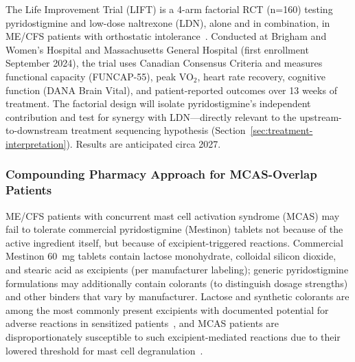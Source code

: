 The Life Improvement Trial (LIFT) is a 4-arm factorial RCT (n=160) testing pyridostigmine and low-dose naltrexone (LDN), alone and in combination, in ME/CFS patients with orthostatic intolerance~\cite{LIFT2025protocol}. Conducted at Brigham and Women's Hospital and Massachusetts General Hospital (first enrollment September 2024), the trial uses Canadian Consensus Criteria and measures functional capacity (FUNCAP-55), peak VO$_2$, heart rate recovery, cognitive function (DANA Brain Vital), and patient-reported outcomes over 13 weeks of treatment. The factorial design will isolate pyridostigmine's independent contribution and test for synergy with LDN---directly relevant to the upstream-to-downstream treatment sequencing hypothesis (Section~\ref{sec:treatment-interpretation}). Results are anticipated circa 2027.

\subsubsection{Compounding Pharmacy Approach for MCAS-Overlap Patients}
\label{sec:pyridostigmine-compounding}

ME/CFS patients with concurrent mast cell activation syndrome (MCAS) may fail to tolerate commercial pyridostigmine (Mestinon) tablets not because of the active ingredient itself, but because of excipient-triggered reactions. Commercial Mestinon 60~mg tablets contain lactose monohydrate, colloidal silicon dioxide, and stearic acid as excipients (per manufacturer labeling); generic pyridostigmine formulations may additionally contain colorants (to distinguish dosage strengths) and other binders that vary by manufacturer. Lactose and synthetic colorants are among the most commonly present excipients with documented potential for adverse reactions in sensitized patients~\cite{Reker2019excipients}, and MCAS patients are disproportionately susceptible to such excipient-mediated reactions due to their lowered threshold for mast cell degranulation~\cite{Afrin2016}.

